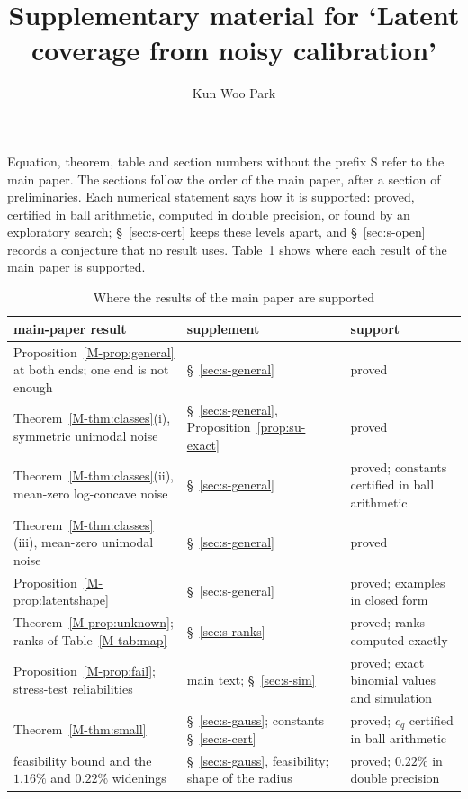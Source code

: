 \documentclass[11pt]{article}
\title{Supplementary material for `Latent coverage from noisy calibration'}
\author{Kun Woo Park}
\date{}
\renewcommand{\_}{\usc\allowbreak}
\begin{document}
\maketitle

\noindent Equation, theorem, table and section numbers without the prefix S refer to the main paper. The sections follow the order of the main paper, after a section of preliminaries. Each numerical statement says how it is supported: proved, certified in ball arithmetic, computed in double precision, or found by an exploratory search; \S~\ref{sec:s-cert} keeps these levels apart, and \S~\ref{sec:s-open} records a conjecture that no result uses. Table~\ref{tab:s-roadmap} shows where each result of the main paper is supported.

\begin{table}[h]
\centering
\caption{Where the results of the main paper are supported}
\label{tab:s-roadmap}
\footnotesize
\begin{tabular}{>{\raggedright\arraybackslash}p{}>{\raggedright\arraybackslash}p{}>{\raggedright\arraybackslash}p{}}
\toprule
main-paper result & supplement & support \\
\midrule
Proposition~\ref{M-prop:general} at both ends; one end is not enough & \S~\ref{sec:s-general} & proved \\
Theorem~\ref{M-thm:classes}(i), symmetric unimodal noise & \S~\ref{sec:s-general}, Proposition~\ref{prop:su-exact} & proved \\
Theorem~\ref{M-thm:classes}(ii), mean-zero log-concave noise & \S~\ref{sec:s-general} & proved; constants certified in ball arithmetic \\
Theorem~\ref{M-thm:classes}(iii), mean-zero unimodal noise & \S~\ref{sec:s-general} & proved \\
Proposition~\ref{M-prop:latentshape} & \S~\ref{sec:s-general} & proved; examples in closed form \\
Theorem~\ref{M-prop:unknown}; ranks of Table~\ref{M-tab:map} & \S~\ref{sec:s-ranks} & proved; ranks computed exactly \\
Proposition~\ref{M-prop:fail}; stress-test reliabilities & main text; \S~\ref{sec:s-sim} & proved; exact binomial values and simulation \\
Theorem~\ref{M-thm:small} & \S~\ref{sec:s-gauss}; constants \S~\ref{sec:s-cert} & proved; $c_q$ certified in ball arithmetic \\
feasibility bound and the $1.16\%$ and $0.22\%$ widenings & \S~\ref{sec:s-gauss}, feasibility; shape of the radius & proved; $0.22\%$ in double precision \\

\end{tabular}
\end{table}
\end{document}
